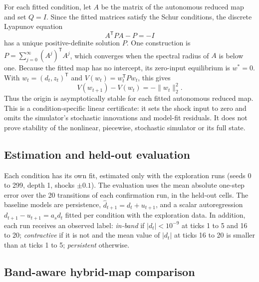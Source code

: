 For each fitted condition, let $A$ be the matrix of the autonomous reduced map and set $Q=I$. Since the fitted matrices satisfy the Schur conditions, the discrete Lyapunov equation
\begin{equation}
  A^{\mathsf T}PA-P=-I
  \label{eq:lyap-reduced}
\end{equation}
has a unique positive-definite solution $P$. One construction is $P=\sum_{j=0}^{\infty}(A^j)^{\mathsf T}A^j$, which converges when the spectral radius of $A$ is below one. Because the fitted map has no intercept, its zero-input equilibrium is $w^*=0$. With $w_t=(d_t,z_t)^{\mathsf T}$ and $V(w_t)=w_t^{\mathsf T}Pw_t$, this gives
\begin{equation}
  V(w_{t+1})-V(w_t)=-\lVert w_t\rVert_2^2.
  \label{eq:lyap-decrease}
\end{equation}
Thus the origin is asymptotically stable for each fitted autonomous reduced map. This is a condition-specific linear certificate: it sets the shock input to zero and omits the simulator's stochastic innovations and model-fit residuals. It does not prove stability of the nonlinear, piecewise, stochastic simulator or its full state.

\subsection{Estimation and held-out evaluation}

Each condition has its own fit, estimated only with the exploration runs (seeds 0 to 299, depth 1, shocks $\pm0.1$). The evaluation uses the mean absolute one-step error over the 20 transitions of each confirmation run, in the held-out cells. The baseline models are persistence, $\hat d_{t+1}=d_t+u_{t+1}$, and a scalar autoregression $d_{t+1}-u_{t+1}=a_s d_t$ fitted per condition with the exploration data. In addition, each run receives an observed label: \emph{in-band} if $|d_t|<10^{-9}$ at ticks 1 to 5 and 16 to 20; \emph{contractive} if it is not and the mean value of $|d_t|$ at ticks 16 to 20 is smaller than at ticks 1 to 5; \emph{persistent} otherwise.

\subsection{Band-aware hybrid-map comparison}
\label{sec:hybrid-method}

